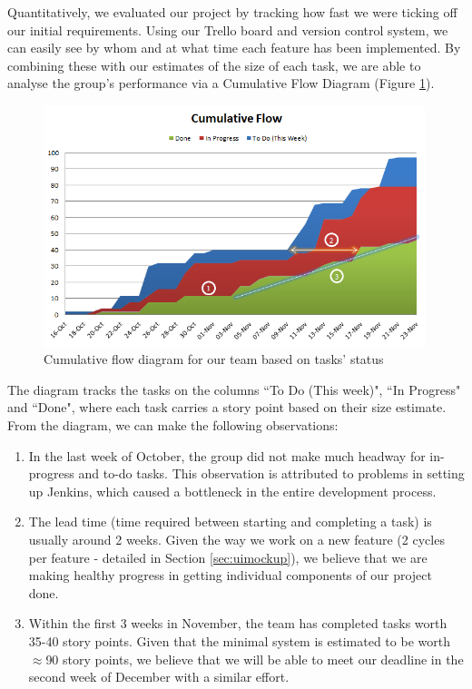 \documentclass[a4paper]{article}
\begin{document}
Quantitatively, we evaluated our project by tracking how fast we were ticking off our initial requirements. Using our Trello board and version control system, we can easily see by whom and at what time each feature has been implemented. By combining these with our estimates of the size of each task, we are able to analyse the group's performance via a Cumulative Flow Diagram (Figure \ref{fig:cumuflow}).

\begin{figure}[H]
  \includegraphics[width = 0.99\textwidth]{./evaluation/cumu_flow.png}
  \caption{Cumulative flow diagram for our team based on tasks' status}
  \label{fig:cumuflow}
\end{figure}

The diagram tracks the tasks on the columns ``To Do (This week)", ``In Progress" and ``Done", where each task carries a story point based on their size estimate. From the diagram, we can make the following observations:

\begin{enumerate}

  \item In the last week of October, the group did not make much headway for in-progress and to-do tasks. This observation is attributed to problems in setting up Jenkins, which caused a bottleneck in the entire development process.

  \item The lead time (time required between starting and completing a task) is usually around 2 weeks. Given the way we work on a new feature (2 cycles per feature - detailed in Section \ref{sec:uimockup}), we believe that we are making healthy progress in getting individual components of our project done.

  \item Within the first 3 weeks in November, the team has completed tasks worth 35-40 story points. Given that the minimal system is estimated to be worth $\approx$90 story points, we believe that we will be able to meet our deadline in the second week of December with a similar effort.

\end{enumerate}
\end{document}
